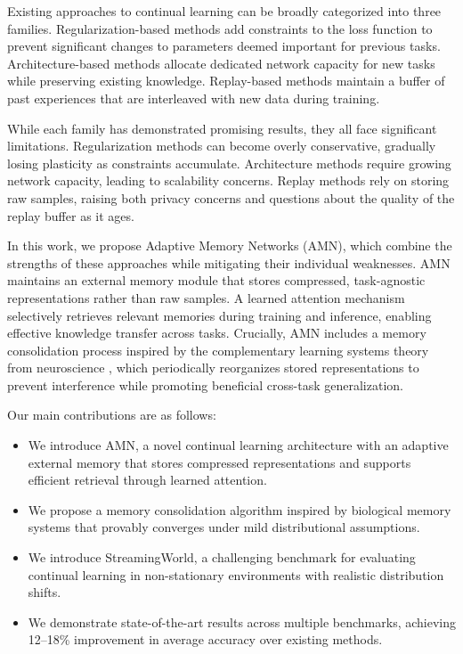 \documentclass[11pt]{article}
\begin{document}
Existing approaches to continual learning can be broadly categorized into three families. Regularization-based methods \citep{kirkpatrick2017overcoming, zenke2017continual, aljundi2018memory} add constraints to the loss function to prevent significant changes to parameters deemed important for previous tasks. Architecture-based methods \citep{rusu2016progressive, yoon2018lifelong, li2019learn} allocate dedicated network capacity for new tasks while preserving existing knowledge. Replay-based methods \citep{rebuffi2017icarl, shin2017continual, rolnick2019experience} maintain a buffer of past experiences that are interleaved with new data during training.

While each family has demonstrated promising results, they all face significant limitations. Regularization methods can become overly conservative, gradually losing plasticity as constraints accumulate. Architecture methods require growing network capacity, leading to scalability concerns. Replay methods rely on storing raw samples, raising both privacy concerns and questions about the quality of the replay buffer as it ages.

In this work, we propose Adaptive Memory Networks (AMN), which combine the strengths of these approaches while mitigating their individual weaknesses. AMN maintains an external memory module that stores compressed, task-agnostic representations rather than raw samples. A learned attention mechanism selectively retrieves relevant memories during training and inference, enabling effective knowledge transfer across tasks. Crucially, AMN includes a memory consolidation process inspired by the complementary learning systems theory from neuroscience \citep{mcclelland1995there, kumaran2016learning}, which periodically reorganizes stored representations to prevent interference while promoting beneficial cross-task generalization.

Our main contributions are as follows:
\begin{itemize}
    \item We introduce AMN, a novel continual learning architecture with an adaptive external memory that stores compressed representations and supports efficient retrieval through learned attention.
    \item We propose a memory consolidation algorithm inspired by biological memory systems that provably converges under mild distributional assumptions.
    \item We introduce StreamingWorld, a challenging benchmark for evaluating continual learning in non-stationary environments with realistic distribution shifts.
    \item We demonstrate state-of-the-art results across multiple benchmarks, achieving 12--18\% improvement in average accuracy over existing methods.
\end{itemize}
\end{document}
